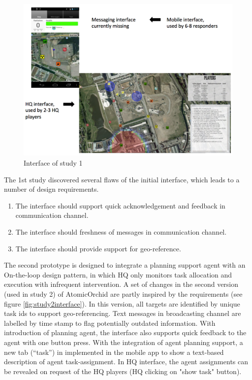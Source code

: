 \begin{figure}[H]
  \centering
  \includegraphics[width=1\textwidth]{img/conclusion/study1interface}
  \caption{Interface of study 1}
  \label{fig:study1interface}
\end{figure}

The 1st study discovered several flaws of the initial interface, which leads to a number of design requirements. 

\begin{enumerate}
	 \item The interface should support quick acknowledgement and feedback in communication channel.
	 \item The interface should freshness of messages in communication channel.
	 \item The interface should provide support for geo-reference.
\end{enumerate}

The second prototype is designed to integrate a planning support agent with an On-the-loop design pattern, in which HQ only monitors task allocation and execution with infrequent intervention. A set of changes in the second version (used in study 2) of AtomicOrchid are partly inspired by the requirements (see figure \ref{fig:study2interface}). In this version, all targets are identified by unique task ids to support geo-referencing. Text messages in broadcasting channel are labelled by time stamp to flag potentially outdated information. With introduction of planning agent, the interface also supports quick feedback to the agent with one button press. With the integration of agent planning support, a new tab (``task'') in implemented in the mobile app to show a text-based description of agent task-assignment. In HQ interface, the agent assignments can be revealed on request of the HQ players (HQ clicking on "show task" button).\\

